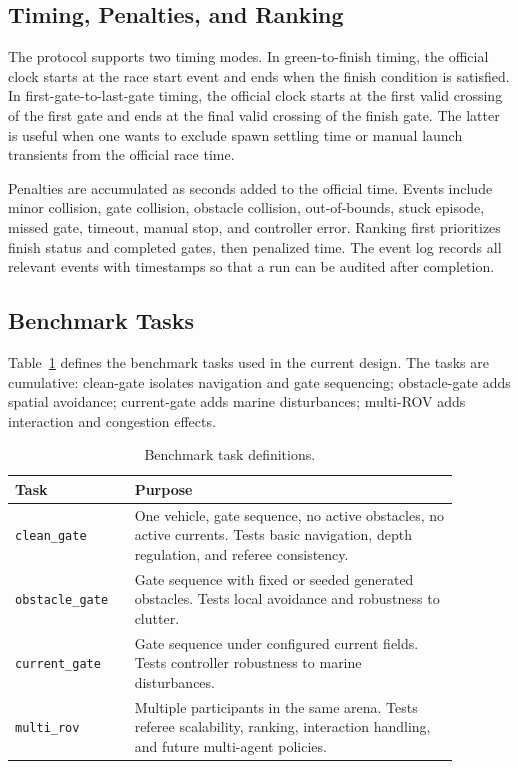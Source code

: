 \subsection{Timing, Penalties, and Ranking}

The protocol supports two timing modes. In green-to-finish timing, the official clock starts at the race start event and ends when the finish condition is satisfied. In first-gate-to-last-gate timing, the official clock starts at the first valid crossing of the first gate and ends at the final valid crossing of the finish gate. The latter is useful when one wants to exclude spawn settling time or manual launch transients from the official race time.

Penalties are accumulated as seconds added to the official time. Events include minor collision, gate collision, obstacle collision, out-of-bounds, stuck episode, missed gate, timeout, manual stop, and controller error. Ranking first prioritizes finish status and completed gates, then penalized time. The event log records all relevant events with timestamps so that a run can be audited after completion.

\subsection{Benchmark Tasks}

Table~\ref{tab:benchmark_tasks} defines the benchmark tasks used in the current design. The tasks are cumulative: clean-gate isolates navigation and gate sequencing; obstacle-gate adds spatial avoidance; current-gate adds marine disturbances; multi-ROV adds interaction and congestion effects.

\begin{table}[t]
\centering
\scriptsize
\renewcommand{\arraystretch}{1.08}
\caption{Benchmark task definitions.}
\label{tab:benchmark_tasks}
\begin{tabular}{p{0.23\linewidth}p{0.65\linewidth}}
\toprule
Task & Purpose \\
\midrule
\texttt{clean\_gate} & One vehicle, gate sequence, no active obstacles, no active currents. Tests basic navigation, depth regulation, and referee consistency. \\
\texttt{obstacle\_gate} & Gate sequence with fixed or seeded generated obstacles. Tests local avoidance and robustness to clutter. \\
\texttt{current\_gate} & Gate sequence under configured current fields. Tests controller robustness to marine disturbances. \\
\texttt{multi\_rov} & Multiple participants in the same arena. Tests referee scalability, ranking, interaction handling, and future multi-agent policies. \\
\bottomrule
\end{tabular}
\end{table}


